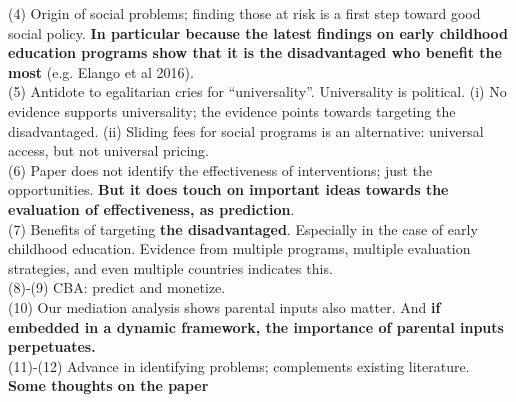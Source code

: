 \noindent (4) Origin of social problems; finding those at risk is a first step toward good social policy. \textbf{In particular because the latest findings on early childhood education programs show that it is the disadvantaged who benefit the most} (e.g. Elango et al 2016).\\

\noindent (5) Antidote to egalitarian cries for ``universality''. Universality is political. (i) No evidence supports universality; the evidence points towards targeting the disadvantaged. (ii) Sliding fees for social programs is an alternative: universal access, but not universal pricing.\\

\noindent (6) Paper does not identify the effectiveness of interventions; just the opportunities. \textbf{But it does touch on important ideas towards the evaluation of effectiveness, as prediction}.\\

\noindent (7) Benefits of targeting \textbf{the disadvantaged}. Especially in the case of early childhood education. Evidence from multiple programs, multiple evaluation strategies, and even multiple countries indicates this.\\ 

\noindent (8)-(9) CBA: predict and monetize.\\

\noindent (10) Our mediation analysis shows parental inputs also matter. And \textbf{if embedded in a dynamic framework, the importance of parental inputs perpetuates.}\\

\noindent (11)-(12) Advance in identifying problems; complements existing literature.\\

\noindent \textbf{Some thoughts on the paper}


